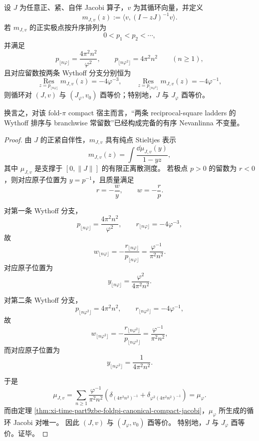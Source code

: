 \begin{theorem}\label{thm:xi-time-part9zbf-foldpi-wythoff-nevanlinna-rigidity}
设 \(J\) 为任意正、紧、自伴 Jacobi 算子，\(v\) 为其循环向量，并定义
\[
m_{J,v}(z):=\langle v,(I-zJ)^{-1}v\rangle.
\]
若 \(m_{J,v}\) 的正实极点按升序排列为
\[
0<p_1<p_2<\cdots,
\]
并满足
\[
p_{\lfloor n\varphi\rfloor}=\frac{4\pi^2n^2}{\varphi^2},
\qquad
p_{\lfloor n\varphi^2\rfloor}=4\pi^2n^2
\qquad (n\ge 1),
\]
且对应留数按两条 Wythoff 分支分别恒为
\[
\operatorname*{Res}_{z=p_{\lfloor n\varphi\rfloor}}m_{J,v}(z)=-4\varphi^{-3},
\qquad
\operatorname*{Res}_{z=p_{\lfloor n\varphi^2\rfloor}}m_{J,v}(z)=-4\varphi^{-1},
\]
则循环对 \((J,v)\) 与 \((J_\varphi,v_0)\) 酉等价；特别地，\(J\) 与 \(J_\varphi\) 酉等价。

换言之，对该 fold-\(\pi\) compact 宿主而言，“两条 reciprocal-square ladders 的 Wythoff 排序与 branchwise 常留数”已经构成完备的有序 Nevanlinna 不变量。
\end{theorem}
\begin{proof}
由 \(J\) 的正紧自伴性，\(m_{J,v}\) 具有纯点 Stieltjes 表示
\[
m_{J,v}(z)=\int\frac{\dd\mu_{J,v}(y)}{1-yz},
\]
其中 \(\mu_{J,v}\) 是支撑于 \([0,\|J\|]\) 的有限正离散测度。
若极点 \(p>0\) 的留数为 \(r<0\)，则对应原子位置为 \(y=p^{-1}\)，且质量满足
\[
r=-\frac{w}{y},
\qquad
w=-\frac{r}{p}.
\]

对第一条 Wythoff 分支，
\[
p_{\lfloor n\varphi\rfloor}=\frac{4\pi^2n^2}{\varphi^2},
\qquad
r_{\lfloor n\varphi\rfloor}=-4\varphi^{-3},
\]
故
\[
w_{\lfloor n\varphi\rfloor}
=
-\frac{r_{\lfloor n\varphi\rfloor}}{p_{\lfloor n\varphi\rfloor}}
=
\frac{\varphi^{-1}}{\pi^2n^2}.
\]
对应原子位置为
\[
y_{\lfloor n\varphi\rfloor}
=
\frac{\varphi^2}{4\pi^2n^2}.
\]

对第二条 Wythoff 分支，
\[
p_{\lfloor n\varphi^2\rfloor}=4\pi^2n^2,
\qquad
r_{\lfloor n\varphi^2\rfloor}=-4\varphi^{-1},
\]
故
\[
w_{\lfloor n\varphi^2\rfloor}
=
-\frac{r_{\lfloor n\varphi^2\rfloor}}{p_{\lfloor n\varphi^2\rfloor}}
=
\frac{\varphi^{-1}}{\pi^2n^2},
\]
而对应原子位置为
\[
y_{\lfloor n\varphi^2\rfloor}
=
\frac{1}{4\pi^2n^2}.
\]

于是
\[
\mu_{J,v}
=
\sum_{n\ge 1}\frac{\varphi^{-1}}{\pi^2n^2}
\left(
\delta_{(4\pi^2n^2)^{-1}}
+
\delta_{\varphi^2(4\pi^2n^2)^{-1}}
\right)
=
\mu_\varphi.
\]
而由定理 \ref{thm:xi-time-part9zbe-foldpi-canonical-compact-jacobi}，\(\mu_\varphi\) 所生成的循环 Jacobi 对唯一。
因此 \((J,v)\) 与 \((J_\varphi,v_0)\) 酉等价。
特别地，\(J\) 与 \(J_\varphi\) 酉等价。证毕。
\end{proof}

